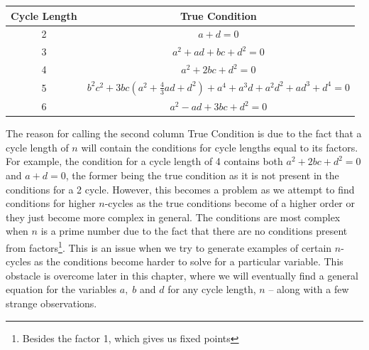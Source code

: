 \documentclass[12pt]{article}
\begin{document}
	\begin{table}[H]
		\begin{center}
			\begin{tabular}{|c|c|}
				\hline
				Cycle Length &                           True Condition                           \\ \hline\hline
				     2       &                              $a+d=0$                               \\ \hline
				     3       &                         $a^2+ad+bc+d^2=0$                          \\ \hline
				     4       &                          $a^2+2bc+d^2=0$                           \\ \hline
				     5       & $b^2c^2+3bc(a^2 + \frac{4}{3}ad + d^2)+a^4+a^3d+a^2d^2+ad^3+d^4=0$ \\ \hline
				     6       &                         $a^2-ad+3bc+d^2=0$                         \\ \hline
			\end{tabular}
		\end{center}
	\end{table}
\noindent The reason for calling the second column True Condition is due to the fact that a cycle length of $n$ will contain the conditions for cycle lengths equal to its factors. For example, the condition for a cycle length of 4 contains both $a^2+2bc+d^2=0$ and $a+d=0$, the former being the true condition as it is not present in the conditions for a 2 cycle. 
However, this becomes a problem as we attempt to find conditions for higher $n$-cycles as the true conditions become of a higher order or they just become more complex in general. The conditions are most complex when $n$ is a prime number due to the fact that there are no conditions present from factors\footnote{Besides the factor 1, which gives us fixed points}. This is an issue when we try to generate examples of certain $n$-cycles as the conditions become harder to solve for a particular variable.
This obstacle is overcome later in this chapter, where we will eventually find a general equation for the variables $a,\;b$ and $d$ for any cycle length, $n$ -- along with a few strange observations.
\end{document}
